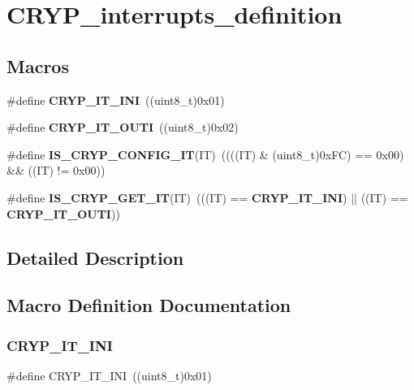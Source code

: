 \section{C\+R\+Y\+P\+\_\+interrupts\+\_\+definition}
\label{group__CRYP__interrupts__definition}
\subsection*{Macros}
\begin{DoxyCompactItemize}
\item 
\#define \textbf{ C\+R\+Y\+P\+\_\+\+I\+T\+\_\+\+I\+NI}~((uint8\+\_\+t)0x01)
\item 
\#define \textbf{ C\+R\+Y\+P\+\_\+\+I\+T\+\_\+\+O\+U\+TI}~((uint8\+\_\+t)0x02)
\item 
\#define \textbf{ I\+S\+\_\+\+C\+R\+Y\+P\+\_\+\+C\+O\+N\+F\+I\+G\+\_\+\+IT}(IT)~((((IT) \& (uint8\+\_\+t)0x\+F\+C) == 0x00) \&\& ((\+I\+T) != 0x00))
\item 
\#define \textbf{ I\+S\+\_\+\+C\+R\+Y\+P\+\_\+\+G\+E\+T\+\_\+\+IT}(IT)~(((IT) == \textbf{ C\+R\+Y\+P\+\_\+\+I\+T\+\_\+\+I\+NI}) $\vert$$\vert$ ((IT) == \textbf{ C\+R\+Y\+P\+\_\+\+I\+T\+\_\+\+O\+U\+TI}))
\end{DoxyCompactItemize}


\subsection{Detailed Description}


\subsection{Macro Definition Documentation}
\mbox{\label{group__CRYP__interrupts__definition_gab6d24428b95658217df49013a81b4f7c}} 
\subsubsection{C\+R\+Y\+P\+\_\+\+I\+T\+\_\+\+I\+NI}
{\footnotesize\ttfamily \#define C\+R\+Y\+P\+\_\+\+I\+T\+\_\+\+I\+NI~((uint8\+\_\+t)0x01)}

